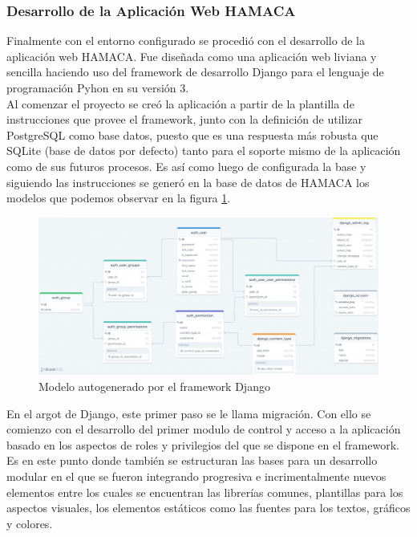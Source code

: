 \subsubsection{Desarrollo de la Aplicación Web HAMACA}
Finalmente con el entorno configurado se procedió con el desarrollo de la aplicación web HAMACA. Fue diseñada como una aplicación web liviana y sencilla haciendo uso del framework de desarrollo Django para el lenguaje de programación Pyhon en su versión 3.\\

Al comenzar el proyecto se creó la aplicación a partir de la plantilla de instrucciones que provee el framework, junto con la definición de utilizar PostgreSQL como base datos, puesto que es una respuesta más robusta que SQLite (base de datos por defecto) tanto para el soporte mismo de la aplicación como de sus futuros procesos. Es así como luego de configurada la base y siguiendo las instrucciones se generó en la base de datos de HAMACA los modelos que podemos observar en la figura \ref{fig:django_schema}.
\begin{figure}[!htb]
\centering
\includegraphics[scale=0.505]{./Figuras/django_schema.jpg}
\caption{Modelo autogenerado por el framework Django}
\label{fig:django_schema}
\end{figure}

En el argot de Django, este primer paso se le llama migración. Con ello se comienzo con el desarrollo del primer modulo de control y acceso a la aplicación basado en los aspectos de roles y privilegios del que se dispone en el framework.\\

Es en este punto donde también se estructuran las bases para un desarrollo modular en el que se fueron integrando progresiva e incrimentalmente nuevos elementos entre los cuales se encuentran las librerías comunes, plantillas para los aspectos visuales, los elementos estáticos como las fuentes para los textos, gráficos y colores.\\ 

